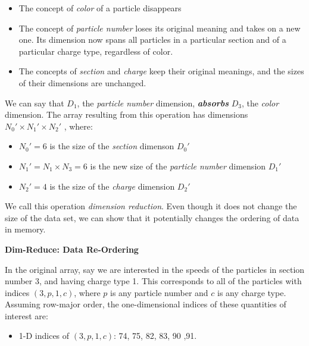 \documentclass[conference]{IEEEtran}
\newcommand{\subsubsubsection}{\noindent\textbf}
\begin{document}
\begin{itemize}

\item The concept of {\em color} of a particle disappears

\item The concept of {\em particle number} loses its original meaning and takes
on a new one. Its dimension now spans all particles in a particular section and
of a particular charge type, regardless of color.

\item The concepts of {\em section} and {\em charge} keep their original
meanings, and the sizes of their dimensions are unchanged.

\end{itemize}

We can say that $D_1$, the {\em particle number} dimension, \textbf{\em
absorbs} $D_3$, the {\em color} dimension. The array resulting from this
operation has dimensions $N_0'{\times}N_1'{\times}N_2'$ , where:

\begin{itemize}

\item $N_0' = 6$ is the size of the {\em section} dimenson $D_0'$

\item $N_1' = N_1{\times}N_3 = 6$ is the new size of the {\em particle number} dimension $D_1'$

\item $N_2' = 4$ is the size of the {\em charge} dimension $D_2'$

\end{itemize}

We call this operation {\em dimension reduction}. Even though it does not
change the size of the data set, we can show that it potentially changes the
ordering of data in memory.

\subsubsubsection{Dim-Reduce: Data Re-Ordering}

In the original array, say we are interested in the speeds of the particles in
section number 3, and having charge type 1. This corresponds to all of the
particles with indices $(3, p, 1, c)$, where $p$ is any particle number and $c$
is any charge type. Assuming row-major order, the one-dimensional indices of
these quantities of interest are:

\begin{itemize}

\item 1-D indices of $(3, p, 1, c)$: 74, 75, 82, 83, 90 ,91.

\end{itemize}
\end{document}
